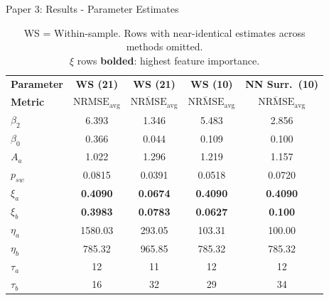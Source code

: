 \documentclass[10pt,aspectratio=169]{beamer}
\begin{document}
\begin{frame}{Paper 3: Results - Parameter Estimates}
\small{
\begin{table}[H]
\centering
\begin{tabular}{lcccc}
\hline
\textbf{Parameter} & \textbf{WS (21)} & \textbf{WS (21)} & \textbf{WS (10)} & \textbf{NN Surr.\ (10)} \\
\textbf{Metric} & $\mathrm{NRMSE}_{\mathrm{avg}}$ & $\overline{\mathrm{NRMSE}}_{\mathrm{avg}}$ & $\overline{\mathrm{NRMSE}}_{\mathrm{avg}}$ & $\overline{\mathrm{NRMSE}}_{\mathrm{avg}}$ \\
\hline
$\beta_2$              & 6.393  & 1.346  & 5.483  & 2.856  \\
$\beta_0$              & 0.366  & 0.044  & 0.109  & 0.100  \\
$A_a$                  & 1.022  & 1.296  & 1.219  & 1.157  \\
$p_{sw}$               & 0.0815 & 0.0391 & 0.0518 & 0.0720 \\
\textbf{$\xi_a$}       & \textbf{0.4090} & \textbf{0.0674} & \textbf{0.4090} & \textbf{0.4090} \\
\textbf{$\xi_b$}       & \textbf{0.3983} & \textbf{0.0783} & \textbf{0.0627} & \textbf{0.100}  \\
$\eta_a$               & 1580.03 & 293.05 & 103.31 & 100.00 \\
$\eta_b$               & 785.32  & 965.85 & 785.32 & 785.32 \\
$\tau_a$               & 12     & 11     & 12     & 12     \\
$\tau_b$               & 16     & 32     & 29     & 34     \\
\hline
\end{tabular}
\caption*{WS = Within-sample. Rows with near-identical estimates across methods omitted. \\ $\xi$ rows \textbf{bolded}: highest feature importance.}
\end{table}
}
\end{frame}
\end{document}
